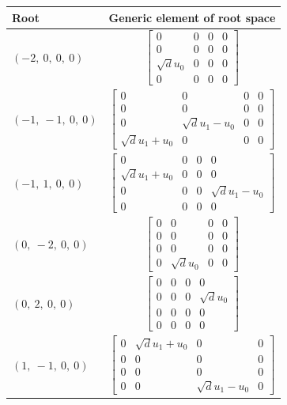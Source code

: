 \documentclass[11pt]{article}
\theoremstyle{definition}
\begin{document}
\bigskip

\noindent \begin{longtable}{|l|c|}
    \hline
    \textbf{Root} & \textbf{Generic element of root space} \\
    \hline
    \endhead
    $\left( -2, \  0, \  0, \  0\right)$ & ${\left[\begin{matrix}0 & 0 & 0 & 0\\0 & 0 & 0 & 0\\\sqrt{d} u_{0} & 0 & 0 & 0\\0 & 0 & 0 & 0\end{matrix}\right]}$ \\
    \hline
    $\left( -1, \  -1, \  0, \  0\right)$ & ${\left[\begin{matrix}0 & 0 & 0 & 0\\0 & 0 & 0 & 0\\0 & \sqrt{d} u_{1} - u_{0} & 0 & 0\\\sqrt{d} u_{1} + u_{0} & 0 & 0 & 0\end{matrix}\right]}$ \\
    \hline
    $\left( -1, \  1, \  0, \  0\right)$ & ${\left[\begin{matrix}0 & 0 & 0 & 0\\\sqrt{d} u_{1} + u_{0} & 0 & 0 & 0\\0 & 0 & 0 & \sqrt{d} u_{1} - u_{0}\\0 & 0 & 0 & 0\end{matrix}\right]}$ \\
    \hline
    $\left( 0, \  -2, \  0, \  0\right)$ & ${\left[\begin{matrix}0 & 0 & 0 & 0\\0 & 0 & 0 & 0\\0 & 0 & 0 & 0\\0 & \sqrt{d} u_{0} & 0 & 0\end{matrix}\right]}$ \\
    \hline
    $\left( 0, \  2, \  0, \  0\right)$ & ${\left[\begin{matrix}0 & 0 & 0 & 0\\0 & 0 & 0 & \sqrt{d} u_{0}\\0 & 0 & 0 & 0\\0 & 0 & 0 & 0\end{matrix}\right]}$ \\
    \hline
    $\left( 1, \  -1, \  0, \  0\right)$ & ${\left[\begin{matrix}0 & \sqrt{d} u_{1} + u_{0} & 0 & 0\\0 & 0 & 0 & 0\\0 & 0 & 0 & 0\\0 & 0 & \sqrt{d} u_{1} - u_{0} & 0\end{matrix}\right]}$ \\

\end{longtable}
\end{document}
